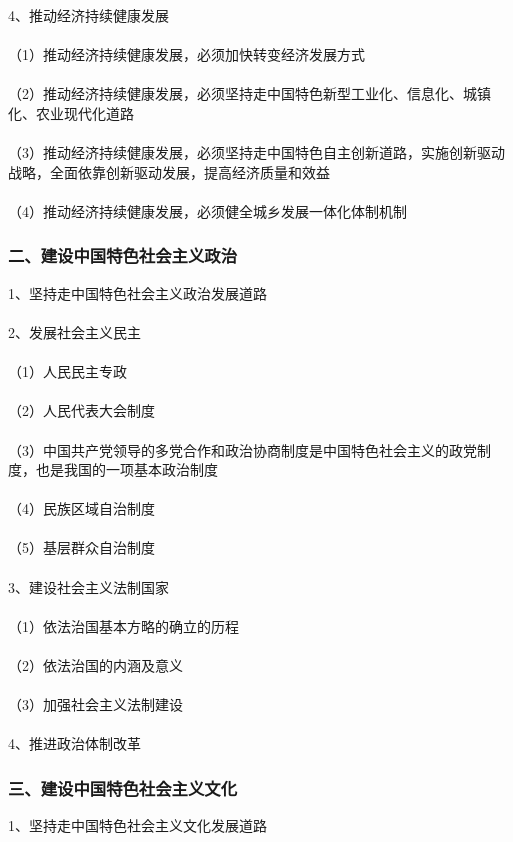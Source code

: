 \documentclass{ctexart}
\begin{document}
4、推动经济持续健康发展
\\\\
（1）推动经济持续健康发展，必须加快转变经济发展方式
\\\\
（2）推动经济持续健康发展，必须坚持走中国特色新型工业化、信息化、城镇化、农业现代化道路
\\\\
（3）推动经济持续健康发展，必须坚持走中国特色自主创新道路，实施创新驱动战略，全面依靠创新驱动发展，提高经济质量和效益
\\\\
（4）推动经济持续健康发展，必须健全城乡发展一体化体制机制

\subsubsection{二、建设中国特色社会主义政治}
1、坚持走中国特色社会主义政治发展道路
\\\\

2、发展社会主义民主
\\\\
（1）人民民主专政
\\\\
（2）人民代表大会制度
\\\\
（3）中国共产党领导的多党合作和政治协商制度是中国特色社会主义的政党制度，也是我国的一项基本政治制度
\\\\
（4）民族区域自治制度
\\\\
（5）基层群众自治制度
\\\\

3、建设社会主义法制国家
\\\\
（1）依法治国基本方略的确立的历程
\\\\
（2）依法治国的内涵及意义
\\\\
（3）加强社会主义法制建设
\\\\

4、推进政治体制改革

\subsubsection{三、建设中国特色社会主义文化}
1、坚持走中国特色社会主义文化发展道路
\\\\
\end{document}
